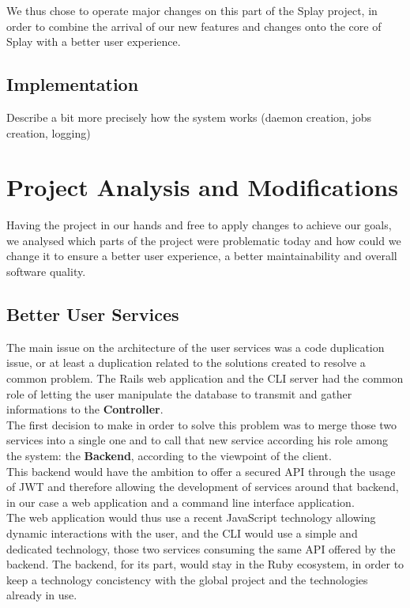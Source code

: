 \documentclass{eplmastersthesis}
\begin{document}
        We thus chose to operate major changes on this part of the Splay
        project, in order to combine the arrival of our new features and
        changes onto the core of Splay with a better user experience.

      \subsection{Implementation}

        Describe a bit more precisely how the system works (daemon creation,
        jobs creation, logging)

    \section{Project Analysis and Modifications}

      Having the project in our hands and free to apply changes to achieve our
      goals, we analysed which parts of the project were problematic today and
      how could we change it to ensure a better user experience, a better
      maintainability and overall software quality.

      \subsection{Better User Services}

        The main issue on the architecture of the user services was a code
        duplication issue, or at least a duplication related to the solutions
        created to resolve a common problem. The Rails web application and the
        CLI server had the common role of letting the user manipulate the
        database to transmit and gather informations to the \textbf{Controller}.\\

        The first decision to make in order to solve this problem was to
        merge those two services into a single one and to call that new
        service according his role among the system: the \textbf{Backend},
        according to the viewpoint of the client.\\
        This backend would have the ambition to offer a secured API through
        the usage of JWT \cite{JWT} and therefore allowing the development
        of services around that backend, in our case a web application and
        a command line interface application.\\

        The web application would thus use a recent JavaScript technology
        allowing dynamic interactions with the user, and the CLI would use
        a simple and dedicated technology, those two services consuming the
        same API offered by the backend. The backend, for its part, would
        stay in the Ruby ecosystem, in order to keep a technology concistency
        with the global project and the technologies already in use.
\end{document}

